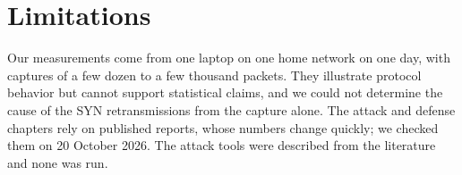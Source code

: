 \section{Limitations}

Our measurements come from one laptop on one home network on one day, with captures of a few dozen to a few thousand packets. They illustrate protocol behavior but cannot support statistical claims, and we could not determine the cause of the SYN retransmissions from the capture alone. The attack and defense chapters rely on published reports, whose numbers change quickly; we checked them on 20 October 2026. The attack tools were described from the literature and none was run.
